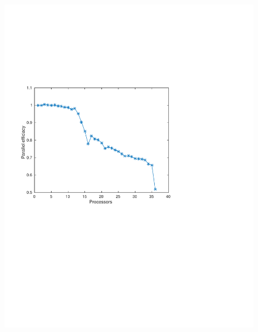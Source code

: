 \begin{figure}
\centering
\includegraphics[width=0.7\linewidth]{./figures/efficiacy}
\caption{}
\label{fig:efficiacy}
\end{figure}
